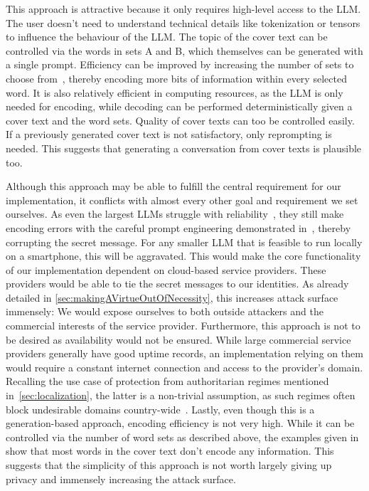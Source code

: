 This approach is attractive because it only requires high-level access to the \gls{LLM}. The user doesn't need to understand technical details like tokenization or tensors to influence the behaviour of the \gls{LLM}. The topic of the cover text can be controlled via the words in sets A and B, which themselves can be generated with a single prompt. Efficiency can be improved by increasing the number of sets to choose from~\cite{steinebachNaturalLanguageSteganography2024}, thereby encoding more bits of information within every selected word. It is also relatively efficient in computing resources, as the \gls{LLM} is only needed for encoding, while decoding can be performed deterministically given a cover text and the word sets. Quality of cover texts can too be controlled easily. If a previously generated cover text is not satisfactory, only reprompting is needed. This suggests that generating a conversation from cover texts is plausible too.

Although this approach may be able to fulfill the central requirement for our implementation, it conflicts with almost every other goal and requirement we set ourselves. As even the largest \glspl{LLM} struggle with reliability~\cite{vendrowLargeLanguageModel2025}, they still make encoding errors with the careful prompt engineering demonstrated in~\cite{steinebachNaturalLanguageSteganography2024,wuPromptingSteganographyNew2024}, thereby corrupting the secret message. For any smaller \gls{LLM} that is feasible to run locally on a smartphone, this will be aggravated. This would make the core functionality of our implementation dependent on cloud-based service providers. These providers would be able to tie the secret messages to our identities. As already detailed in \cref{sec:makingAVirtueOutOfNecessity}, this increases attack surface immensely: We would expose ourselves to both outside attackers and the commercial interests of the service provider. Furthermore, this approach is not to be desired as availability would not be ensured. While large commercial service providers generally have good uptime records, an implementation relying on them would require a constant internet connection and access to the provider's domain. Recalling the use case of protection from authoritarian regimes mentioned in~\cref{sec:localization}, the latter is a non-trivial assumption, as such regimes often block undesirable domains country-wide~\cite{wongSocialMediaMay2016,michaelsonJournalistsMore11002025}. Lastly, even though this is a generation-based approach, encoding efficiency is not very high. While it can be controlled via the number of word sets as described above, the examples given in~\cite{steinebachNaturalLanguageSteganography2024} show that most words in the cover text don't encode any information. This suggests that the simplicity of this approach is not worth largely giving up privacy and immensely increasing the attack surface.

